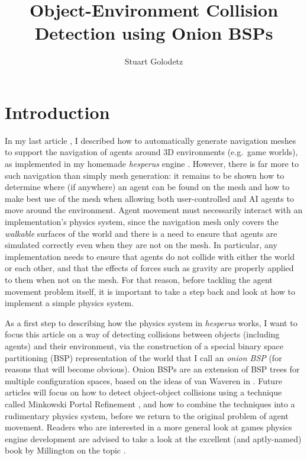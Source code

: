\documentclass[10pt,twocolumn]{article}
\begin{document}
\title{Object-Environment Collision Detection using Onion BSPs}
\author{Stuart Golodetz}
\date{}
\maketitle

\section{Introduction}

In my last article \cite{golodetzoverload13oct}, I described how to automatically generate navigation meshes to support the navigation of agents around 3D environments (e.g.~game worlds), as implemented in my homemade \emph{hesperus} engine \cite{hesperus}. However, there is far more to such navigation than simply mesh generation: it remains to be shown how to determine where (if anywhere) an agent can be found on the mesh and how to make best use of the mesh when allowing both user-controlled and AI agents to move around the environment. Agent movement must necessarily interact with an implementation's physics system, since the navigation mesh only covers the \emph{walkable} surfaces of the world and there is a need to ensure that agents are simulated correctly even when they are not on the mesh. In particular, any implementation needs to ensure that agents do not collide with either the world or each other, and that the effects of forces such as gravity are properly applied to them when not on the mesh. For that reason, before tackling the agent movement problem itself, it is important to take a step back and look at how to implement a simple physics system.

As a first step to describing how the physics system in \emph{hesperus} works, I want to focus this article on a way of detecting collisions between objects (including agents) and their environment, via the construction of a special binary space partitioning (BSP) representation of the world that I call an \emph{onion BSP} (for reasons that will become obvious). Onion BSPs are an extension of BSP trees for multiple configuration spaces, based on the ideas of van Waveren in \cite{vanwaveren01}. Future articles will focus on how to detect object-object collisions using a technique called Minkowski Portal Refinement \cite{snethen08}, and how to combine the techniques into a rudimentary physics system, before we return to the original problem of agent movement. Readers who are interested in a more general look at games physics engine development are advised to take a look at the excellent (and aptly-named) book by Millington on the topic \cite{millington07}.
\end{document}
